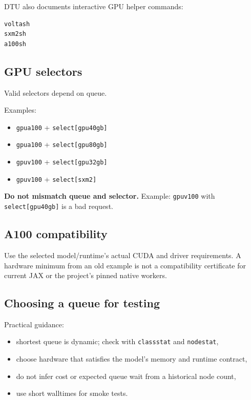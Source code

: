 \documentclass[11pt,a4paper]{article}
\begin{document}
DTU also documents interactive GPU helper commands:

\begin{lstlisting}[style=shell]
voltash
sxm2sh
a100sh
\end{lstlisting}

\subsection{GPU selectors}

Valid selectors depend on queue.

Examples:
\begin{itemize}[leftmargin=1.5em]
  \item \texttt{gpua100} + \texttt{select[gpu40gb]}
  \item \texttt{gpua100} + \texttt{select[gpu80gb]}
  \item \texttt{gpuv100} + \texttt{select[gpu32gb]}
  \item \texttt{gpuv100} + \texttt{select[sxm2]}
\end{itemize}

\textbf{Do not mismatch queue and selector.} Example: \texttt{gpuv100} with \texttt{select[gpu40gb]} is a bad request.

\subsection{A100 compatibility}

Use the selected model/runtime's actual CUDA and driver requirements. A hardware
minimum from an old example is not a compatibility certificate for current JAX
or the project's pinned native workers.

\subsection{Choosing a queue for testing}

Practical guidance:

\begin{itemize}[leftmargin=1.5em]
  \item shortest queue is dynamic; check with \texttt{classstat} and \texttt{nodestat},
  \item choose hardware that satisfies the model's memory and runtime contract,
  \item do not infer cost or expected queue wait from a historical node count,
  \item use short walltimes for smoke tests.
\end{itemize}
\end{document}
